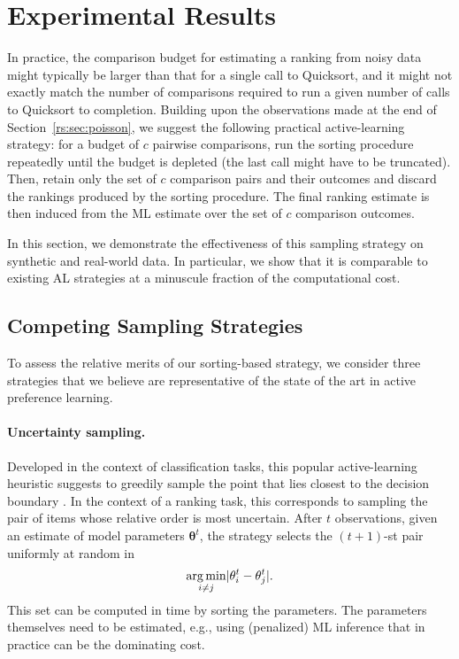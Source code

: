 \section{Experimental Results}  %
\label{rs:sec:experiments}

In practice, the comparison budget for estimating a ranking from noisy data might typically be larger than that for a single call to Quicksort, and it might not exactly match the number of comparisons required to run a given number of calls to Quicksort to completion.
Building upon the observations made at the end of Section~\ref{rs:sec:poisson}, we suggest the following practical active-learning strategy:
for a budget of $c$ pairwise comparisons, run the sorting procedure repeatedly until the budget is depleted (the last call might have to be truncated).
Then, retain only the set of $c$ comparison pairs and their outcomes and discard the rankings produced by the sorting procedure.
The final ranking estimate is then induced from the ML estimate over the set of $c$ comparison outcomes.

In this section, we demonstrate the effectiveness of this sampling strategy on synthetic and real-world data.
In particular, we show that it is comparable to existing AL strategies at a minuscule fraction of the computational cost.


\subsection{Competing Sampling Strategies}

To assess the relative merits of our sorting-based strategy, we consider three strategies that we believe are representative of the state of the art in active preference learning.

\paragraph{Uncertainty sampling.}
Developed in the context of classification tasks, this popular active-learning heuristic suggests to greedily sample the point that lies closest to the decision boundary \citep{settles2012active}.
In the context of a ranking task, this corresponds to sampling the pair of items whose relative order is most uncertain.
After $t$ observations, given an estimate of model parameters $\bm{\theta}^t$, the strategy selects the $(t\!+\!1)$-st pair uniformly at random in
\begin{align*}
\operatorname*{arg\,min}_{i \ne j} \lvert \theta^t_i - \theta^t_j \rvert.
\end{align*}
This set can be computed in time  by sorting the parameters.
The parameters themselves need to be estimated, e.g., using (penalized) ML inference that in practice can be the dominating cost.

